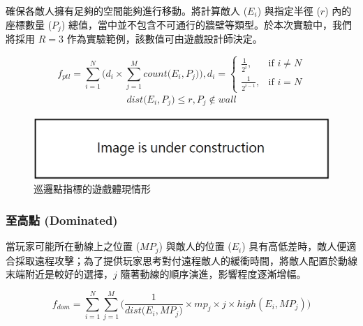確保各敵人擁有足夠的空間能夠進行移動。將計算敵人 ($E_{i}$) 與指定半徑 ($r$) 內的座標數量 ($P_j$) 總值，當中並不包含不可通行的牆壁等類型。於本次實驗中，我們將採用 $R=3$ 作為實驗範例，該數值可由遊戲設計師決定。

\begin{equation}
    f_{ptl} = \sum_{i=1}^{N} \Big( d_{i} \times \sum_{j=1}^{M} count\big(E_{i}, P_{j}\big) \Big), 
    d_{i} = \begin{cases}
                \frac{1}{2^{i}},   & \mbox{if } i \neq N \\
                \frac{1}{2^{i-1}}, & \mbox{if } i = N
            \end{cases}
\end{equation}
\begin{gather*}
    dist\big(E_{i}, P_{j}\big) \leq r,  P_{j} \notin wall
\end{gather*}

\begin{figure}[ht]
  \begin{center}
    \includegraphics[width=1.0\textwidth]{figures/under_construction.png}
    \caption{巡邏點指標的遊戲體現情形}
    \label{fig:fitnesses-patrol-gameplay}
  \end{center}
\end{figure}

\subsubsection{至高點 (Dominated)}
\label{sssec:method-segments-fitnesses-dominated}

當玩家可能所在動線上之位置 ($MP_{j}$) 與敵人的位置 ($E_{i}$) 具有高低差時，敵人便適合採取遠程攻擊；為了提供玩家思考對付遠程敵人的緩衝時間，將敵人配置於動線末端附近是較好的選擇，$j$ 隨著動線的順序演進，影響程度逐漸增幅。

\begin{equation}
f_{dom}=\sum_{i=1}^{N} \sum_{j=1}^{M} \Big( \frac{1}{dist\big(E_{i}, MP_{j}\big)} \times mp_{j} \times j \times high(E_{i}, MP_{j}) \Big)
\end{equation}

